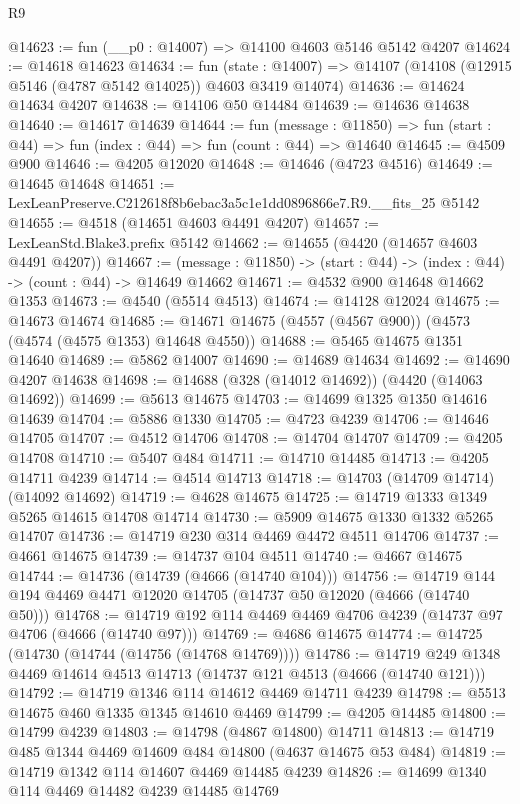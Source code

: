 \begin{lexlean}{R9}
\begin{coremodule}
@14623 := fun (__p0 : @14007) => @14100 @4603 @5146 @5142 @4207
@14624 := @14618 @14623
@14634 := fun (state : @14007) =>
  @14107 (@14108 (@12915 @5146 (@4787 @5142 @14025)) @4603 @3419 @14074)
@14636 := @14624 @14634 @4207
@14638 := @14106 @50 @14484
@14639 := @14636 @14638
@14640 := @14617 @14639
@14644 := fun (message : @11850) =>
  fun (start : @44) => fun (index : @44) => fun (count : @44) => @14640
@14645 := @4509 @900
@14646 := @4205 @12020
@14648 := @14646 (@4723 @4516)
@14649 := @14645 @14648
@14651 := LexLeanPreserve.C212618f8b6ebac3a5c1e1dd0896866e7.R9.__fits_25 @5142
@14655 := @4518 (@14651 @4603 @4491 @4207)
@14657 := LexLeanStd.Blake3.prefix @5142
@14662 := @14655 (@4420 (@14657 @4603 @4491 @4207))
@14667 := (message : @11850) -> (start : @44) -> (index : @44) -> (count : @44) -> @14649 @14662
@14671 := @4532 @900 @14648 @14662 @1353
@14673 := @4540 (@5514 @4513)
@14674 := @14128 @12024
@14675 := @14673 @14674
@14685 := @14671 @14675 (@4557 (@4567 @900)) (@4573 (@4574 (@4575 @1353) @14648 @4550))
@14688 := @5465 @14675 @1351 @14640
@14689 := @5862 @14007
@14690 := @14689 @14634
@14692 := @14690 @4207 @14638
@14698 := @14688 (@328 (@14012 @14692)) (@4420 (@14063 @14692))
@14699 := @5613 @14675
@14703 := @14699 @1325 @1350 @14616 @14639
@14704 := @5886 @1330
@14705 := @4723 @4239
@14706 := @14646 @14705
@14707 := @4512 @14706
@14708 := @14704 @14707
@14709 := @4205 @14708
@14710 := @5407 @484
@14711 := @14710 @14485
@14713 := @4205 @14711 @4239
@14714 := @4514 @14713
@14718 := @14703 (@14709 @14714) (@14092 @14692)
@14719 := @4628 @14675
@14725 := @14719 @1333 @1349 @5265 @14615 @14708 @14714
@14730 := @5909 @14675 @1330 @1332 @5265 @14707
@14736 := @14719 @230 @314 @4469 @4472 @4511 @14706
@14737 := @4661 @14675
@14739 := @14737 @104 @4511
@14740 := @4667 @14675
@14744 := @14736 (@14739 (@4666 (@14740 @104)))
@14756 := @14719 @144 @194 @4469 @4471 @12020 @14705 (@14737 @50 @12020 (@4666 (@14740 @50)))
@14768 := @14719 @192 @114 @4469 @4469 @4706 @4239 (@14737 @97 @4706 (@4666 (@14740 @97)))
@14769 := @4686 @14675
@14774 := @14725 (@14730 (@14744 (@14756 (@14768 @14769))))
@14786 := @14719 @249 @1348 @4469 @14614 @4513 @14713 (@14737 @121 @4513 (@4666 (@14740 @121)))
@14792 := @14719 @1346 @114 @14612 @4469 @14711 @4239
@14798 := @5513 @14675 @460 @1335 @1345 @14610 @4469
@14799 := @4205 @14485
@14800 := @14799 @4239
@14803 := @14798 (@4867 @14800) @14711
@14813 := @14719 @485 @1344 @4469 @14609 @484 @14800 (@4637 @14675 @53 @484)
@14819 := @14719 @1342 @114 @14607 @4469 @14485 @4239
@14826 := @14699 @1340 @114 @4469 @14482 @4239 @14485 @14769

\end{coremodule}
\end{lexlean}
